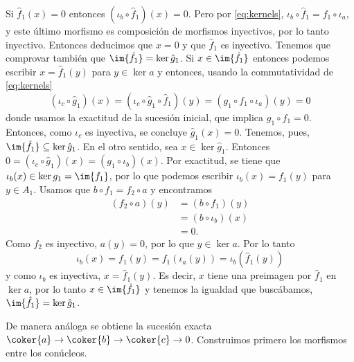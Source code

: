\documentclass[12pt]{article}
\begin{document}
Si \( \hat{f}_1(x) = 0 \) entonces \( (\iota_b \circ \hat{f}_1)(x) = 0 \). Pero por
\eqref{eq:kernels}, \( \iota_b \circ \hat{f}_1 = f_1 \circ \iota_a \), y este último
morfismo es composición de morfismos inyectivos, por lo tanto inyectivo. Entonces
deducimos que \( x = 0 \) y que \( \hat{f}_1 \) es inyectivo. Tenemos que comprovar
también que \( \im{\hat{f}_1} = \ker{\hat{g}_1} \).  Si \( x \in \im{\hat{f}_1} \)
entonces podemos escribir \( x = \hat{f}_1(y) \) para \( y \in \ker{a} \) y entonces,
usando la commutatividad de \eqref{eq:kernels}
\begin{equation*}
	(\iota_c \circ \hat{g}_1)(x) = (\iota_c \circ \hat{g}_1 \circ \hat{f}_1)(y) = (g_1 \circ
	f_1 \circ \iota_a)(y) = 0
\end{equation*}
donde usamos la exactitud de la sucesión inicial, que implica \( g_1 \circ f_1 = 0 \).
Entonces, como \( \iota_c \) es inyectiva, se concluye \( \hat{g}_1(x) = 0 \). Tenemos,
pues, \( \im{\hat{f}_1} \subseteq \ker{\hat{g}_1} \). En el otro sentido, sea \( x \in
\ker{\hat{g}_1} \). Entonces \( 0 = (\iota_c \circ \hat{g}_1)(x) = (g_1 \circ \iota_b)(x)
\). Por exactitud, se tiene que \( \iota_b(x) \in \ker{g_1} = \im{f_1} \), por lo que
podemos escribir \( \iota_b(x) = f_1(y) \) para \( y \in A_1 \). Usamos que \( b \circ f_1
= f_2 \circ a \) y encontramos
\begin{align*}
	(f_2 \circ a)(y) & = (b \circ f_1)(y) \\
									 & = (b \circ \iota_b)(x) \\
									 & = 0.
\end{align*}
Como \( f_2 \) es inyectivo, \( a(y) = 0 \), por lo que \( y \in \ker{a} \). Por lo tanto
\begin{equation*}
	\iota_b(x) = f_1(y) = f_1(\iota_a(y)) = \iota_b(\hat{f}_1(y))
\end{equation*}
y como \( \iota_b \) es inyectiva, \( x = \hat{f}_1(y) \). Es decir, \( x \) tiene una
preimagen por \( \hat{f}_1 \) en \( \ker{a} \), por lo tanto \( x \in \im{\hat{f}_1} \) y
tenemos la igualdad que buscábamos, \( \im{\hat{f}_1} = \ker{\hat{g}_1} \).

De manera análoga se obtiene la sucesión exacta \( \coker{a} \to \coker{b}
\to \coker{c} \to 0 \). Construimos primero los morfismos entre los conúcleos.  
\end{document}
